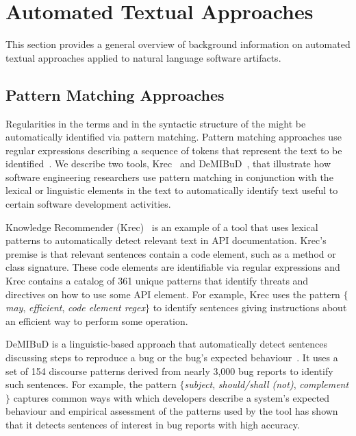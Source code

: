 

\section{Automated Textual Approaches}
\label{cp2:general-approaches}


This section provides a general overview of 
background information on automated textual approaches
applied to natural language software artifacts. 




\subsection{Pattern Matching Approaches}
\label{cp2:pattern-matching}


Regularities in the terms and in the syntactic structure of the 
might be automatically identified via pattern matching.
Pattern matching approaches use regular expressions describing a sequence of tokens that represent
the text to be identified~\cite{Bavota2016}. 
We describe two tools, Krec~\cite{Robillard2015}  and DeMIBuD~\cite{Chaparro2017}, that
illustrate how software engineering 
researchers use pattern matching in conjunction with the lexical or linguistic elements 
in the text to automatically identify 
text useful to certain software development activities.
    


Knowledge Recommender (Krec)~\cite{Robillard2015} 
is an example of a
 tool that uses lexical patterns to 
 automatically detect relevant text in  API documentation. 
Krec's premise is that relevant sentences contain a code element, such as a method or class signature.
These code elements are identifiable via regular expressions 
and Krec contains a catalog of 361 unique patterns 
that identify threats and directives on how to use some API element.
For example, Krec uses the pattern {\small \textit{$\{$may}, \textit{efficient}, \textit{code element regex$\}$}} 
to identify sentences giving instructions about an efficient way to 
perform some operation. 



{\small DeMIBuD} is a linguistic-based approach that 
automatically detect sentences discussing steps to reproduce 
a bug or the bug's expected behaviour~\cite{Chaparro2017}.
It uses a set of 154 discourse patterns
derived from nearly 3,000 bug reports 
to identify such sentences. 
For example, the pattern 
{\small \textit{$\{$subject}, \textit{should/shall (not)}, \textit{complement$\}$}}
captures common ways with which developers describe a system's expected behaviour
and empirical assessment of the patterns used by the tool has shown that it 
detects sentences of interest in bug reports with high accuracy.






